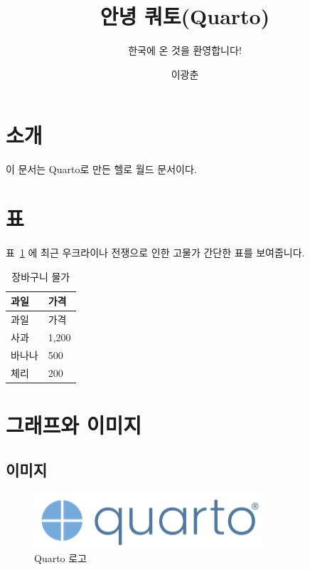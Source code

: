 \documentclass[
  letterpaper,
  DIV=11,
  numbers=noendperiod]{scrartcl}
\title{안녕 쿼토(Quarto)}
\subtitle{한국에 온 것을 환영합니다!}
\author{이광춘}
\date{}
\renewcommand*\contentsname{목 차}
\newcommand\contentsname{목 차}
\begin{document}
\maketitle
\renewcommand*\contentsname{목 차}
{
\hypersetup{linkcolor=}
\setcounter{tocdepth}{3}
\tableofcontents
}
\hypertarget{uxc18cuxac1c}{%
\section{소개}\label{uxc18cuxac1c}}

이 문서는 Quarto로 만든 헬로 월드 문서이다.

\hypertarget{uxd45c}{%
\section{표}\label{uxd45c}}

표~\ref{tbl-bucket} 에 최근 우크라이나 전쟁으로 인한 고물가 간단한 표를
보여줍니다.

\hypertarget{tbl-bucket}{}
\begin{longtable}[]{@{}ll@{}}
\caption{\label{tbl-bucket}장바구니 물가}\tabularnewline
\toprule\noalign{}
과일 & 가격 \\
\midrule\noalign{}
\endfirsthead
\toprule\noalign{}
과일 & 가격 \\
\midrule\noalign{}
\endhead
\bottomrule\noalign{}
\endlastfoot
사과 & 1,200 \\
바나나 & 500 \\
체리 & 200 \\
\end{longtable}

\hypertarget{uxadf8uxb798uxd504uxc640-uxc774uxbbf8uxc9c0}{%
\section{그래프와
이미지}\label{uxadf8uxb798uxd504uxc640-uxc774uxbbf8uxc9c0}}

\hypertarget{uxc774uxbbf8uxc9c0}{%
\subsection{이미지}\label{uxc774uxbbf8uxc9c0}}

\begin{figure}

{\centering \includegraphics{images/quarto_logo.png}

}

\caption{Quarto 로고}

\end{figure}
\end{document}

